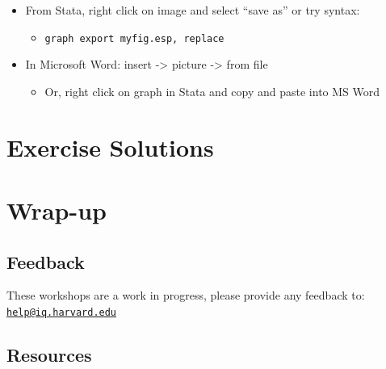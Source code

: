 \documentclass[]{book}
\providecommand{\tightlist}{%
  \setlength{\itemsep}{0pt}\setlength{\parskip}{0pt}}
\begin{document}
\begin{itemize}
\tightlist
\item
  From Stata, right click on image and select ``save as'' or try syntax:

  \begin{itemize}
  \tightlist
  \item
    \texttt{graph\ export\ myfig.esp,\ replace}
  \end{itemize}
\item
  In Microsoft Word: insert -\textgreater{} picture -\textgreater{} from
  file

  \begin{itemize}
  \tightlist
  \item
    Or, right click on graph in Stata and copy and paste into MS Word
  \end{itemize}
\end{itemize}

\section{Exercise Solutions}\label{exercise-solutions-5}

\section{Wrap-up}\label{wrap-up-9}

\subsection{Feedback}\label{feedback-9}

These workshops are a work in progress, please provide any feedback to:
\href{mailto:help@iq.harvard.edu}{\nolinkurl{help@iq.harvard.edu}}

\subsection{Resources}\label{resources-9}
\end{document}

